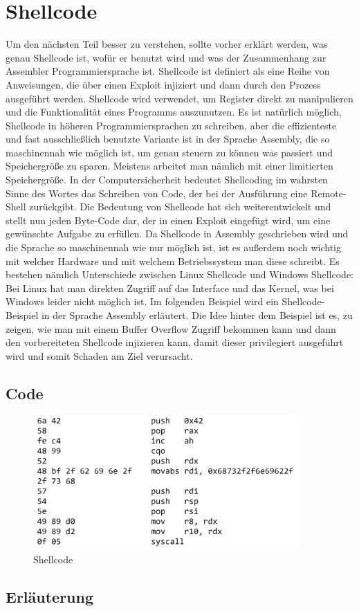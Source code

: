 \section{Shellcode}
Um den nächsten Teil besser zu verstehen, sollte vorher erklärt werden, was genau Shellcode ist, wofür er 
benutzt wird und was der Zusammenhang zur Assembler Programmiersprache ist. Shellcode ist definiert als eine 
Reihe von Anweisungen, die über einen Exploit injiziert und dann durch den Prozess ausgeführt werden.
Shellcode wird verwendet, um Register direkt zu manipulieren und die Funktionalität eines Programms auszunutzen. 
Es ist natürlich möglich, Shellcode in höheren Programmiersprachen zu schreiben, aber die effizienteste und fast 
ausschließlich benutzte Variante ist in der Sprache Assembly, die so maschinennah wie möglich ist, um genau steuern 
zu können was passiert und Speichergröße zu sparen. Meistens arbeitet man nämlich mit einer limitierten Speichergröße.
In der Computersicherheit bedeutet Shellcoding im wahrsten Sinne des Wortes das Schreiben von Code, der bei der
Ausführung eine Remote-Shell zurückgibt. Die Bedeutung von Shellcode hat sich weiterentwickelt und stellt nun jeden
Byte-Code dar, der in einen Exploit eingefügt wird, um eine gewünschte Aufgabe zu erfüllen. Da Shellcode in Assembly
geschrieben wird und die Sprache so maschinennah wie nur möglich ist, ist es außerdem noch wichtig mit welcher
Hardware und mit welchem Betriebssystem man diese schreibt. Es bestehen nämlich Unterschiede zwischen Linux
Shellcode und Windows Shellcode:  Bei Linux hat man direkten Zugriff auf das Interface und das Kernel, was bei
Windows leider nicht möglich ist. Im folgenden Beispiel wird ein Shellcode-Beispiel in der Sprache Assembly erläutert.
Die Idee hinter dem Beispiel ist es, zu zeigen, wie man mit einem Buffer Overflow Zugriff bekommen kann und dann den
vorbereiteten Shellcode injizieren kann, damit dieser privilegiert ausgeführt wird und somit Schaden am Ziel verursacht.

\subsection{Code}
\begin{figure}[h]
    \centering
    \includegraphics[width=0.9\textwidth,height=0.75\textheight,keepaspectratio]{images/shellstorm.png}
    \caption{Shellcode}
\end{figure}
\subsection{Erläuterung}

